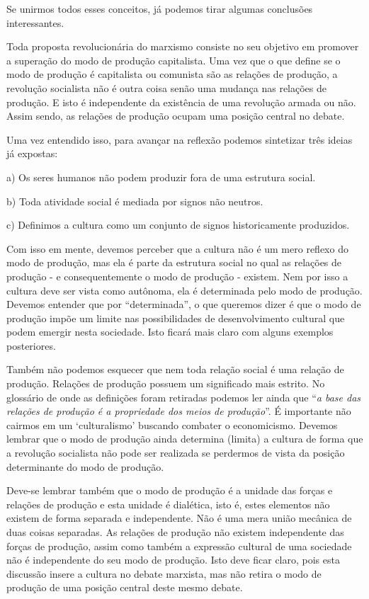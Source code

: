 Se unirmos todos esses conceitos, já podemos tirar algumas conclusões interessantes.

Toda proposta revolucionária do marxismo consiste no seu objetivo em promover a superação do modo de produção capitalista. Uma vez que o que define se o modo de produção é capitalista ou comunista são as relações de produção, a revolução socialista não é outra coisa senão uma mudança nas relações de produção. E isto é independente da existência de uma revolução armada ou não. Assim sendo, as relações de produção ocupam uma posição central no debate.

Uma vez entendido isso, para avançar na reflexão podemos sintetizar três ideias já expostas:

a) Os seres humanos não podem produzir fora de uma estrutura social.

b) Toda atividade social é mediada por signos não neutros.

c) Definimos a cultura como um conjunto de signos historicamente produzidos.

Com isso em mente, devemos perceber que a cultura não é um mero reflexo do modo de produção, mas ela é parte da estrutura social no qual as relações de produção - e consequentemente o modo de produção - existem. Nem por isso a cultura deve ser vista como autônoma, ela é determinada pelo modo de produção. Devemos entender que por “determinada”, o que queremos dizer é que o modo de produção impõe um limite nas possibilidades de desenvolvimento cultural que podem emergir nesta sociedade. Isto ficará mais claro com alguns exemplos posteriores.

Também não podemos esquecer que nem toda relação social é uma relação de produção. Relações de produção possuem um significado mais estrito. No glossário de onde as definições foram retiradas podemos ler ainda que “\textit{a base das relações de produção é a propriedade dos meios de produção}”. É importante não cairmos em um ‘culturalismo’ buscando combater o economicismo. Devemos lembrar que o modo de produção ainda determina (limita) a cultura de forma que a revolução socialista não pode ser realizada se perdermos de vista da posição determinante do modo de produção.

Deve-se lembrar também que o modo de produção é a unidade das forças e relações de produção e esta unidade é dialética, isto é, estes elementos não existem de forma separada e independente. Não é uma mera união mecânica de duas coisas separadas. As relações de produção não existem independente das forças de produção, assim como também a expressão cultural de uma sociedade não é independente do seu modo de produção. Isto deve ficar claro, pois esta discussão insere a cultura no debate marxista, mas não retira o modo de produção de uma posição central deste mesmo debate.


